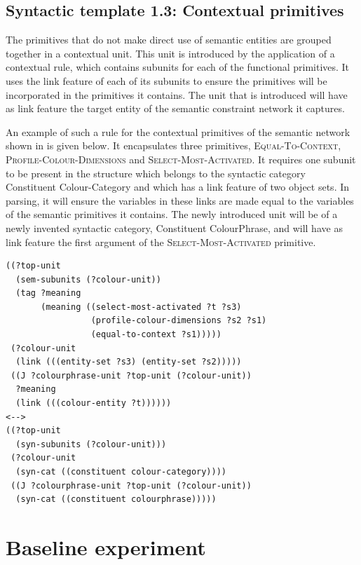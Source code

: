 \subsection{Syntactic template 1.3: Contextual primitives}
\label{s:bcs-contextual-primitive}

The primitives that do not make direct use of semantic entities are
grouped together in a contextual unit. This unit is introduced
by the application of a contextual rule, which contains
subunits for each of the functional primitives. It uses the link
feature of each of its subunits to ensure the primitives will be
incorporated in the primitives it contains. The unit that is
introduced will have as link feature the target entity of the semantic
constraint network it captures.

An example of such a rule for the contextual primitives of the
semantic network shown in  is
given below. It encapsulates three primitives,
\textsc{Equal-To-Context}, \textsc{Profile-Colour-Dimensions} and
\textsc{Select-Most-Activated}. It requires one subunit to be present
in the structure which belongs to the syntactic category Constituent
Colour-Category and which has a link feature of two object sets. In
parsing, it will ensure the variables in these links are made equal to
the variables of the semantic primitives it contains. The newly
introduced unit will be of a newly invented syntactic category,
Constituent ColourPhrase, and will have as link feature the first
argument of the \textsc{Select-Most-Activated} primitive.

\footnotesize
{}
\begin{lstlisting}
((?top-unit
  (sem-subunits (?colour-unit))
  (tag ?meaning
       (meaning ((select-most-activated ?t ?s3)
                 (profile-colour-dimensions ?s2 ?s1)
                 (equal-to-context ?s1)))))
 (?colour-unit
  (link (((entity-set ?s3) (entity-set ?s2)))))
 ((J ?colourphrase-unit ?top-unit (?colour-unit))
  ?meaning
  (link (((colour-entity ?t))))))
<-->
((?top-unit 
  (syn-subunits (?colour-unit)))
 (?colour-unit 
  (syn-cat ((constituent colour-category))))
 ((J ?colourphrase-unit ?top-unit (?colour-unit))
  (syn-cat ((constituent colourphrase)))))
\end{lstlisting}
\normalsize

\section{Baseline experiment}
\label{s:basic-baseline-experiment}

